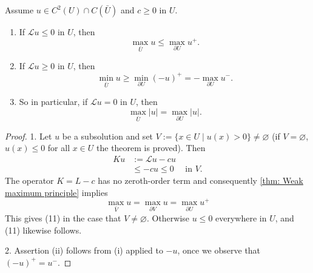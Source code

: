 \begin{theorem}
    Assume $u \in C^2(U) \cap C(\bar{U})$ and $c \geq 0$  in $U$.
    \begin{enumerate}
        \item
              If $\mathcal{L}u \leq 0$ in $U$, then
              \begin{equation*}
                  \max _{\bar{U}} u \leq \max _{\partial U} u^{+} .
              \end{equation*}

        \item 
                If $\mathcal{L}u \geq 0$ in $U$, then
                \begin{equation*}
                    \min _{\bar{U}} u \geq \min _{\partial U}(-u)^{+}=-\max _{\partial U} u^{-} .
                \end{equation*}

        \item
              So in particular, if $\mathcal{L}u=0$ in $U$, then
              \begin{equation*}
                  \max _{\bar{U}}|u|=\max _{\partial U}|u| .
              \end{equation*}
    \end{enumerate}

    \begin{proof}
        1.
        Let $u$ be a subsolution and set $V:=\{x \in U \mid u(x)>0\}\neq \varnothing$
        (if $V=\varnothing$, $u\left(x\right)\leq 0$ for all $x\in U$ the theorem is proved).
        Then
        \begin{equation*}
            \begin{aligned}
                K u & :=\mathcal{L}u-c u                     \\
                    & \leq-c u \leq 0 \quad \text { in } V .
            \end{aligned}
        \end{equation*}
        The operator $K=L-c$ has no zeroth-order term and consequently \ref{thm: Weak maximum principle} implies
        \begin{equation*}
            \max _{\bar{V}} u=\max _{\partial V} u=\max _{\partial U} u^{+}
        \end{equation*}
        This gives (11) in the case that $V \neq \varnothing$. Otherwise $u \leq 0$ everywhere in $U$, and (11) likewise follows.

        2. Assertion (ii) follows from (i) applied to $-u$, once we observe that $(-u)^{+}=u^{-}$.
    \end{proof}
\end{theorem}


